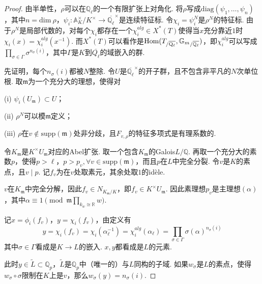 \begin{proof}

    由半单性，$\rho$可以在$\mathbb{Q}_{\ell}$的一个有限扩张上对角化. 将$\rho$写成$\mathrm{diag}(\psi_1,\ldots,\psi_n)$，其中$n=\mathrm{dim}\ \rho$，$\psi_i: \mathbb{A}_{K}^{\times}/K^{\times}\to \overline{\mathbb{Q}_{\ell}}^{\times}$是连续特征标.
    令$\chi_i = \psi_i^N$是$\rho^N$的特征标. 由于$\rho^N$是局部代数的，对每个$\chi_i$都存在一个$\chi_i^{alg}\in X^{*}(T)$使得当$x$充分靠近$1$时$\chi_i(x) = \chi_i^{alg}(x^{-1})$. 而$X^{*}(T)$可以看作是$\mathrm{Hom}({T}_{/\overline{\mathrm{Q}_{\ell}}}, {\mathbb{G}_m}_{/\overline{\mathbb{Q}_{\ell}}})$，即$\chi_i^{alg}$可以写成$\prod_{\sigma\in \Gamma} \sigma^{n_{\sigma}(i)}$，其中$\Gamma$是$K$到$\overline{Q_{\ell}}$的域嵌入的群.

    \vskip0.3cm

    先证明，每个$n_{\sigma}(i)$都被$N$整除. 令$U$是$\overline{\mathbb{Q}_{\ell}}^{\times}$的开子群，且不包含非平凡的$N$次单位根. 取$\mathfrak{m}$为一个充分大的理想，使得对

    (i) $\psi_i(U_{\mathfrak{m}})\subset U$；

    (ii) $\rho^N$可以模$\mathfrak{m}$定义；

    (iii) $\rho$在$v\not\in \mathrm{supp}(\mathfrak{m})$处非分歧，且$F_{v, \rho}$的特征多项式是有理系数的.

    令$K_{\mathfrak{m}}$是$K^{\times} U_{\mathfrak{m}}$对应的Abel扩张. 取一个包含$K_{\mathfrak{m}}$的Galois$L/\mathbb{Q}$. 再取一个充分大的素数$p$，使得$p>\ell$，$p>p_v,\forall v\in \mathrm{supp}(\mathfrak{m})$，而且$p$在$L$中完全分裂. 令$v$是$K$的素点，且$v\mid p$. 记$f_v$为在$v$处取素元，其余处取$1$的idèle.

    $v$在$K_{\mathfrak{m}}$中完全分解，因此$f_v \in N_{K_{\mathfrak{m}}/K}$，即$f_v\in K^{\times} U_{\mathfrak{m}}$. 因此素理想$p_v$是主理想$(\alpha)$，其中$\alpha\equiv 1\pmod{\mathfrak{m}\prod_{k_w\cong \mathbb{R}} w}$.

    记$x = \phi_i(f_v)$，$y = \chi_i(f_v)$，由定义有
    \begin{equation}
        y = \chi_i(f_v) = \chi_i(\alpha^{-1}_{\ell}) = \chi_i^{alg}(\alpha_{\ell}) = \prod_{\sigma\in \Gamma} \sigma(\alpha)^{n_{\sigma}(i)}
    \end{equation}
    其中$\sigma\in \Gamma$看成是$K\to L$的嵌入. $x,y$都看成是$L$的元素.

    此时$y\in \tilde{L}\subset \mathbb{Q}_p$，$\tilde{L}$是$\mathbb{Q}_p$中（唯一的）与$L$同构的子域. 如果$w_{\sigma}$是$L$的素点，使得$w_{\sigma}\circ \sigma$限制在$K$上是$v$，那么$w_{\sigma}(y) = n_{\sigma}(i)$.


\end{proof}
